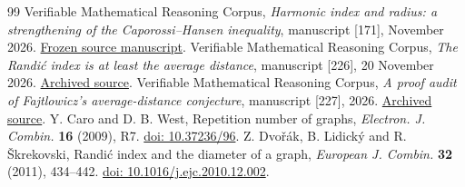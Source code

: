 \documentclass[11pt,a4paper]{article}
\theoremstyle{remark}\newtheorem*{remark}{Remark}
\newcommand{\doi}[1]{\href{https://doi.org/#1}{doi: #1}}
\begin{document}
\begin{thebibliography}{99}
 Verifiable Mathematical Reasoning Corpus, \emph{Harmonic index and radius: a strengthening of the Caporossi--Hansen inequality}, manuscript [171], November 2026. \href{https://github.com/QEEDDD/Verifiable-Mathematical-Reasoning-Corpus/blob/884d261108a87d2229e5bcc273e5f4a607c771d2/\%5B171\%5D\%20Harmonic_Radius_Master_Theorem.tex}{Frozen source manuscript}.
 Verifiable Mathematical Reasoning Corpus, \emph{The Randi\'c index is at least the average distance}, manuscript [226], 20 November 2026. \href{https://github.com/QEEDDD/Verifiable-Mathematical-Reasoning-Corpus/blob/884d261108a87d2229e5bcc273e5f4a607c771d2/\%5B226\%5D\%20Fajtlowicz_Average_Distance_Proof.tex}{Archived source}.
 Verifiable Mathematical Reasoning Corpus, \emph{A proof audit of Fajtlowicz's average-distance conjecture}, manuscript [227], 2026. \href{https://github.com/QEEDDD/Verifiable-Mathematical-Reasoning-Corpus/blob/884d261108a87d2229e5bcc273e5f4a607c771d2/\%5B227\%5D\%20Fajtlowicz_Proof_Audit.tex}{Archived source}.
 Y. Caro and D. B. West, Repetition number of graphs, \emph{Electron. J. Combin.} \textbf{16} (2009), R7. \doi{10.37236/96}.
 Z. Dvo\v{r}\'ak, B. Lidick\'y and R. \v{S}krekovski, Randi\'c index and the diameter of a graph, \emph{European J. Combin.} \textbf{32} (2011), 434--442. \doi{10.1016/j.ejc.2010.12.002}.
\end{thebibliography}
\end{document}
